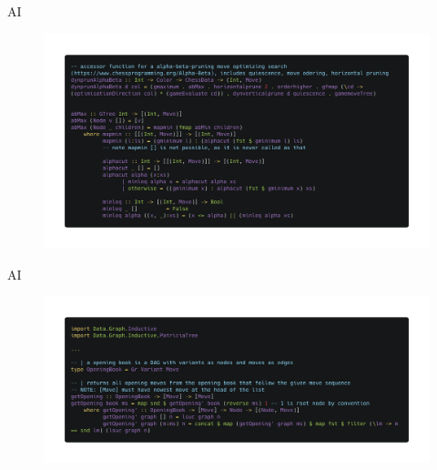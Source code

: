 \documentclass{beamer}
\begin{document}
\begin{frame}{AI}
\begin{figure}
\includegraphics[width=\linewidth]{alphabeta}
\end{figure}
\end{frame}

\begin{frame}{AI}
\begin{figure}
\includegraphics[width=\linewidth]{openingbook.png}
\end{figure}
\end{frame}
\end{document}
